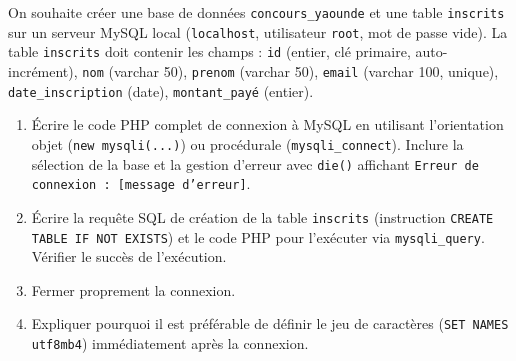 \documentclass[11pt]{article}
\begin{document}
\begin{exercice}
On souhaite créer une base de données \texttt{concours\_yaounde} et une table \texttt{inscrits} sur un serveur MySQL local (\texttt{localhost}, utilisateur \texttt{root}, mot de passe vide). La table \texttt{inscrits} doit contenir les champs : \texttt{id} (entier, clé primaire, auto-incrément), \texttt{nom} (varchar 50), \texttt{prenom} (varchar 50), \texttt{email} (varchar 100, unique), \texttt{date\_inscription} (date), \texttt{montant\_payé} (entier).
\begin{enumerate}
    \item Écrire le code PHP complet de connexion à MySQL en utilisant l'orientation objet (\texttt{new mysqli(...)}) ou procédurale (\texttt{mysqli\_connect}). Inclure la sélection de la base et la gestion d'erreur avec \texttt{die()} affichant \texttt{Erreur de connexion : [message d'erreur]}.
    \item Écrire la requête SQL de création de la table \texttt{inscrits} (instruction \texttt{CREATE TABLE IF NOT EXISTS}) et le code PHP pour l'exécuter via \texttt{mysqli\_query}. Vérifier le succès de l'exécution.
    \item Fermer proprement la connexion.
    \item Expliquer pourquoi il est préférable de définir le jeu de caractères (\texttt{SET NAMES utf8mb4}) immédiatement après la connexion.
\end{enumerate}
\end{exercice}
\end{document}
